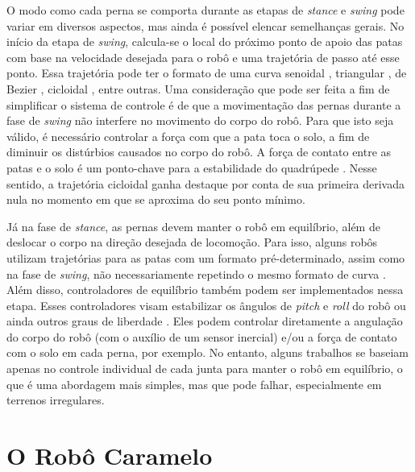 \documentclass[conference]{IEEEtran}
\begin{document}
O modo como cada perna se comporta durante as etapas de \textit{stance} e \textit{swing} pode variar em diversos aspectos, mas ainda é possível elencar semelhanças gerais. No início da etapa de \textit{swing}, calcula-se o local do próximo ponto de apoio das patas com base na velocidade desejada para o robô e uma trajetória de passo até esse ponto. Essa trajetória pode ter o formato de uma curva senoidal \cite{X.118}, triangular \cite{StanfordPupper}, de Bezier \cite{HackadayQuadruped}, cicloidal \cite{Shi2021} \cite{X.58}, entre outras. Uma consideração que pode ser feita a fim de simplificar o sistema de controle é de que a movimentação das pernas durante a fase de \textit{swing} não interfere no movimento do corpo do robô. Para que isto seja válido, é necessário controlar a força com que a pata toca o solo, a fim de diminuir os distúrbios causados no corpo do robô. A força de contato entre as patas e o solo é um ponto-chave para a estabilidade do quadrúpede \cite{X.118}. Nesse sentido, a trajetória cicloidal ganha destaque por conta de sua primeira derivada nula no momento em que se aproxima do seu ponto mínimo.

Já na fase de \textit{stance}, as pernas devem manter o robô em equilíbrio, além de deslocar o corpo na direção desejada de locomoção. Para isso, alguns robôs utilizam trajetórias para as patas com um formato pré-determinado, assim como na fase de \textit{swing}, não necessariamente repetindo o mesmo formato de curva \cite{X.118, X.58}. Além disso, controladores de equilíbrio também podem ser implementados nessa etapa. Esses controladores visam estabilizar os ângulos de \textit{pitch} e \textit{roll} do robô \cite{Shi2021, StanfordPupper, HackadayQuadruped, Notspot} ou ainda outros graus de liberdade \cite{X.134, Chen2020140736, Zhang2016284}. Eles podem controlar diretamente a angulação do corpo do robô (com o auxílio de um sensor inercial) e/ou a força de contato com o solo em cada perna, por exemplo. No entanto, alguns trabalhos se baseiam apenas no controle individual de cada junta para manter o robô em equilíbrio, o que é uma abordagem mais simples, mas que pode falhar, especialmente em terrenos irregulares.

\section{O Robô Caramelo}
\end{document}
